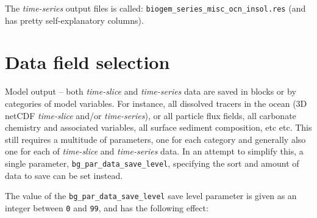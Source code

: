 \documentclass[11pt,fleqn]{book} %
\begin{document}
The \textit{time-series} output files is called: \texttt{biogem\_series\_misc\_ocn\_insol.res} (and has pretty self-explanatory columns).


\newpage


\section{Data field selection}

Model output -- both \textit{time-slice} and \textit{time-series} data are saved in blocks or  by categories of model variables. For instance, all dissolved tracers in the ocean (3D netCDF \textit{time-slice} and/or \textit{time-series}), or all particle flux fields, all carbonate chemistry and associated variables, all surface sediment composition, etc etc. This still requires a multitude of parameters, one for each category and generally also one for each of \textit{time-slice} and \textit{time-series} data. In an attempt to simplify this, a single parameter, \texttt{bg\_par\_data\_save\_level}, specifying the sort and amount of data to save can be set instead.

The value of the \texttt{bg\_par\_data\_save\_level} save level parameter is given as an integer between \texttt{0} and \texttt{99}, and has the following effect:
\end{document}
